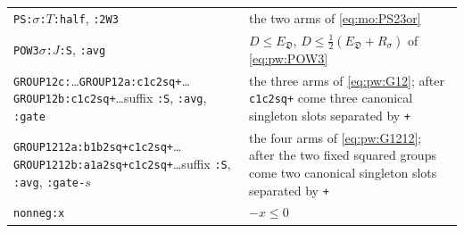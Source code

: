 \documentclass{amsart}
\theoremstyle{definition}
\theoremstyle{plain}
\numberwithin{equation}{section}
\numberwithin{table}{section}
\begin{document}
\begin{table}[ht]
\begin{tabular}{@{}>{\raggedright\arraybackslash}p{}@{\quad}>{\raggedright\arraybackslash}p{}@{}}
\texttt{PS:}$\sigma$\texttt{:}$T$\texttt{:half}, \texttt{:2W3} & the two arms of \eqref{eq:mo:PS23or}\\
\texttt{POW3}$\sigma$\texttt{:}$J$\texttt{:S}, \texttt{:avg} & $D\le E_{\mathfrak D}$, $D\le\frac12(E_{\mathfrak D}+R_\sigma)$ of \eqref{eq:pw:POW3}\\
\texttt{GROUP12c:}\dots\newline \texttt{GROUP12a:c1c2sq+}\dots\newline \texttt{GROUP12b:c1c2sq+}\dots\newline suffix \texttt{:S}, \texttt{:avg}, \texttt{:gate} & the three arms of \eqref{eq:pw:G12}; after \texttt{c1c2sq+} come three canonical singleton slots separated by \texttt{+}\\
\texttt{GROUP1212a:b1b2sq+c1c2sq+}\dots\newline \texttt{GROUP1212b:a1a2sq+c1c2sq+}\dots\newline suffix \texttt{:S}, \texttt{:avg}, \texttt{:gate-}$s$ & the four arms of \eqref{eq:pw:G1212}; after the two fixed squared groups come two canonical singleton slots separated by \texttt{+}\\
\texttt{nonneg:x} & $-x\le0$\\
\hline
\end{tabular}
\end{table}
\end{document}
